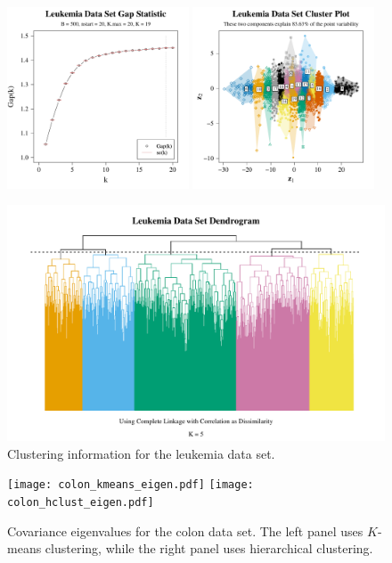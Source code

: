 \documentclass[10pt]{article}
\begin{document}
\newpage


\begin{figure}[ht]
\centering
\includegraphics[width = 0.48\textwidth]{leuk_gap_stat.pdf}
\includegraphics[width = 0.48\textwidth]{leuk_clus_plot.pdf}

\includegraphics[width = \textwidth]{leuk_den.pdf}
\caption{Clustering information for the leukemia data set.}
\label{leukclus}
\end{figure}



\newpage

\begin{figure}[ht]
\centering
\texttt{[image: colon\_kmeans\_eigen.pdf]}
\texttt{[image: colon\_hclust\_eigen.pdf]}

\caption{Covariance eigenvalues for the colon data set. The left panel uses $K$-means clustering, while the right panel uses hierarchical clustering.}
\label{coloneigen}
\end{figure}
\end{document}
